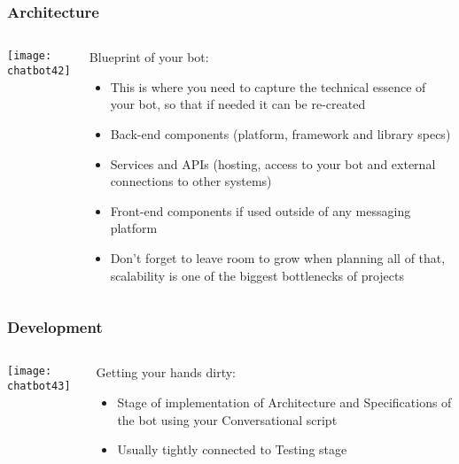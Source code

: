 \begin{frame}[fragile]\frametitle{Architecture}
    \begin{columns}
    \begin{column}[t]{0.5\linewidth}
\begin{center}
\texttt{[image: chatbot42]}
\end{center}
\end{column}
    \begin{column}[t]{0.5\linewidth}
 Blueprint of your bot:
\begin{itemize}
\item This is where you need to capture the technical essence of your bot, so that if needed it can be re-created
\item Back-end components (platform, framework and library specs)
\item Services and APIs (hosting, access to your bot and external connections to other systems)
\item Front-end components if used outside of any messaging platform
\item Don't forget to leave room to grow when planning all of that, scalability is one of the biggest bottlenecks of projects
\end{itemize}
\end{column}
\end{columns}
\end{frame}


\begin{frame}[fragile]\frametitle{Development}
    \begin{columns}
    \begin{column}[t]{0.5\linewidth}
\begin{center}
\texttt{[image: chatbot43]}
\end{center}
\end{column}
    \begin{column}[t]{0.5\linewidth}
Getting your hands dirty:
\begin{itemize}
\item Stage of implementation of Architecture and Specifications of the bot using your Conversational script
\item Usually tightly connected to Testing stage
\end{itemize}
\end{column}
\end{columns}
\end{frame}

